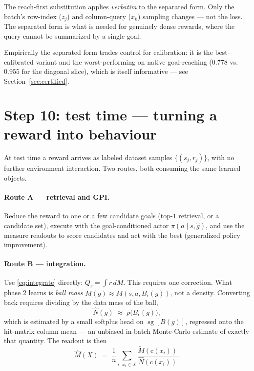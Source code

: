 \documentclass[11pt]{article}
\newcommand{\sg}{\operatorname{sg}}
\newcommand{\ball}[1]{B_\epsilon(#1)}
\newcommand{\cube}{\mathrm{c}}
\begin{document}
\begin{keybox}
The reach-first substitution applies \emph{verbatim} to the separated form. Only
the batch's row-index ($z_j$) and column-query ($x_k$) sampling changes --- not
the loss. The separated form is what is needed for genuinely dense rewards, where
the query cannot be summarized by a single goal.
\end{keybox}

Empirically the separated form trades control for calibration: it is the
best-calibrated variant and the worst-performing on native goal-reaching
($0.778$ vs.\ $0.955$ for the diagonal slice), which is itself informative --- see
Section~\ref{sec:certified}.

\section{Step 10: test time --- turning a reward into behaviour}
\label{sec:testtime}

At test time a reward arrives as labeled dataset samples $\{(s_j,r_j)\}$, with no
further environment interaction. Two routes, both consuming the same learned
objects.

\paragraph{Route A --- retrieval and GPI.} Reduce the reward to one or a few
candidate goals (top-$1$ retrieval, or a candidate set), execute with the
goal-conditioned actor $\pi(a\mid s,\hat g)$, and use the measure readouts to
score candidates and act with the best (generalized policy improvement).

\paragraph{Route B --- integration.} Use \eqref{eq:integrate} directly:
$Q_r=\int r\,dM$. This requires one correction. What phase 2 learns is
\emph{ball mass} $\tilde M(g) \approx M(s,a,\ball{g})$, not a density. Converting
back requires dividing by the data mass of the ball,
\[
\hat N(g) \;\approx\; \rho\big(\ball{g}\big),
\]
which is estimated by a small softplus head on $\sg[B(g)]$, regressed onto the
hit-matrix column mean --- an unbiased in-batch Monte-Carlo estimate of exactly
that quantity. The readout is then
\[
\hat M(X) \;=\; \frac{1}{n}\sum_{i:\,x_i\in X} \frac{\tilde M(\cube(x_i))}{\hat N(\cube(x_i))}.
\]
\end{document}

